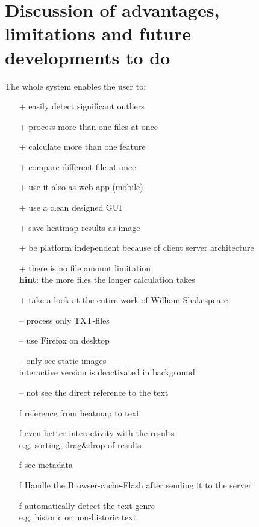 \documentclass[runningheads]{llncs}
\begin{document}
\section{Discussion of advantages, limitations and future developments to do}
The whole system enables the user to:
\begin{itemize}
    \item[+] easily detect significant outliers
    \item[+] process more than one files at once
    \item[+] calculate more than one feature
    \item[+] compare different file at once
    \item[+] use it also as web-app (mobile)
    \item[+] use a clean designed GUI
    \item[+] save heatmap results as image
    \item[+] be platform independent because of client server architecture
    \item[+] there is no file amount limitation \\ \textbf{hint}: the more files the longer calculation takes
    \item[+] take a look at the entire work of \href{http://shakespeare.mit.edu/}{William Shakespeare}
    \item[--] process only TXT-files
    \item[--] use Firefox on desktop
    \item[--] only see static images \\ interactive version is deactivated in background
    \item[--] not see the direct reference to the text
    \item[f] reference from heatmap to text
    \item[f] even better interactivity with the results \\e.g. sorting, drag\&drop of results
    \item[f] see metadata
    \item[f] Handle the Browser-cache-Flash after sending it to the server
    \item[f] automatically detect the text-genre \\e.g. historic or  non-historic text
\end{itemize}
\end{document}
